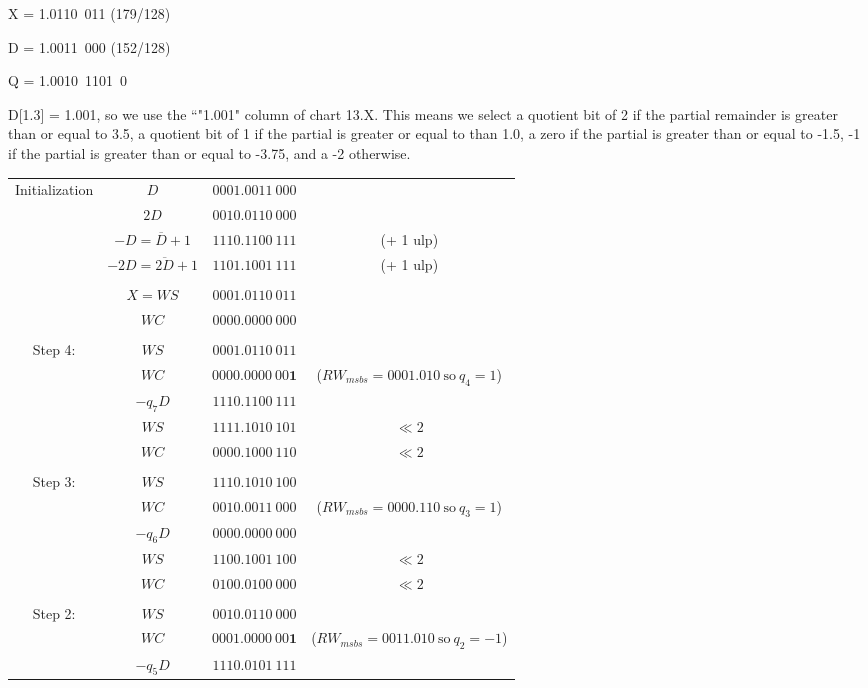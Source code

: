 \documentclass[12pt]{article}
\begin{document}
\vfill
\eject

X = 1.0110\ 011 (179/128)

D = 1.0011\ 000 (152/128)

Q = 1.0010\ 1101\ 0

D[1.3] = 1.001, so we use the ``"1.001" column of chart 13.X. This means we select a quotient bit of 2 if the partial remainder is greater than or equal to 3.5, a quotient bit of 1 if the partial is greater or equal to than 1.0, a zero if the partial is greater than or equal to -1.5, -1 if the partial is greater than or equal to -3.75, and a -2 otherwise.
\begin{center}
\begin{tabular}{cccc}
    Initialization&$D$&$0001.0011\ 000$&\\
    &$2D$&$0010.0110\ 000$&\\
    &$-D=\overline{D}+1$&$1110.1100\ 111$&(+ 1 ulp)\\
    &$-2D=\overline{2D}+1$&$1101.1001\ 111$&(+ 1 ulp)\\
    &&&\\
    &$X=WS$&$0001.0110\ 011$&\\
    &$WC$&$0000.0000\ 000$&\\
    \hdashline\\
    Step 4:&$WS$&$0001.0110\ 011$&\\
    &$WC$&$0000.0000\ 00\mathbf{1}$&($RW_{msbs}=0001.010\ \text{so}\ q_4=1$)\\
    &$-q_7D$&$1110.1100\ 111$&\\
    \cline{2-3}
    &$WS$&$1111.1010\ 101$&$\ll2$\\
    &$WC$&$0000.1000\ 110$&$\ll2$\\
    \hdashline\\
    Step 3:&$WS$&$1110.1010\ 100$&\\
    &$WC$&$0010.0011\ 000$&($RW_{msbs}=0000.110\ \text{so}\ q_3=1$)\\
    &$-q_6D$&$0000.0000\ 000$&\\
    \cline{2-3}
    &$WS$&$1100.1001\ 100$&$\ll2$\\
    &$WC$&$0100.0100\ 000$&$\ll2$\\
    \hdashline\\
    Step 2:&$WS$&$0010.0110\ 000$&\\
    &$WC$&$0001.0000\ 00\mathbf{1}$&($RW_{msbs}=0011.010\ \text{so}\ q_2=-1$)\\
    &$-q_5D$&$1110.0101\ 111$&\\
    \cline{2-3}
\end{tabular}
\end{center}
\end{document}
